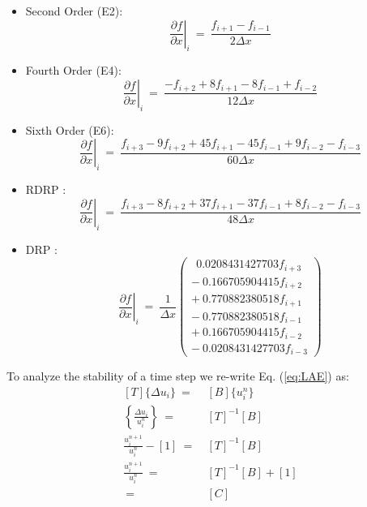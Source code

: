 \documentclass[conf]{new-aiaa}
\begin{document}
\begin{itemize}
	\item Second Order (E2):
		\begin{equation*}
			\left.\frac{\partial{f}}{\partial{x}}\right|_{i}~=~\frac{f_{i+1}-f_{i-1}}{2\Delta{x}}
		\end{equation*}
	\item Fourth Order (E4):
		\begin{equation*}
			\left.\frac{\partial{f}}{\partial{x}}\right|_{i}~=~\frac{-f_{i+2}+8f_{i+1}-8f_{i-1}+f_{i-2}}{12\Delta{x}}
		\end{equation*}	
	\item Sixth Order (E6):
		\begin{equation*}
			\left.\frac{\partial{f}}{\partial{x}}\right|_{i}~=~\frac{f_{i+3}-9f_{i+2}+45f_{i+1}-45f_{i-1}+9f_{i-2}-f_{i-3}}{60\Delta{x}}
		\end{equation*}
	\item RDRP \cite{RDRP}:
		\begin{equation*}
			\left.\frac{\partial{f}}{\partial{x}}\right|_{i}~=~\frac{f_{i+3}-8f_{i+2}+37f_{i+1}-37f_{i-1}+8f_{i-2}-f_{i-3}}{48\Delta{x}}
		\end{equation*}
	\item DRP \cite{DRP}:
		\begin{equation*}
			\left.\frac{\partial{f}}{\partial{x}}\right|_{i}~=~\frac{1}{\Delta{x}}
				\left(\begin{matrix} 	
					~~0.0208431427703f_{i+3} \\
					-~0.166705904415f_{i+2}  \\
					+~0.770882380518f_{i+1}  \\
					-~0.770882380518f_{i-1}  \\
					+~0.166705904415f_{i-2}  \\
					-~0.0208431427703f_{i-3}
				\end{matrix}
				\right)
		\end{equation*}
\end{itemize}
To analyze the stability of a time step we re-write Eq. (\ref{eq:LAE}) as:
\begin{equation}
\label{eq:AB}
	\begin{split}
  		[T]\{\Delta{u_i\}}~=&~[B]\{u_i^{n}\} \\
  		\left\{\frac{\Delta{u_i}}{u_i^{n}}\right\}~=&~[T]^{-1}[B] \\
  		\frac{u_i^{n+1}}{u_i^{n}} - [1]~=&~[T]^{-1}[B] \\
  		\frac{u_i^{n+1}}{u_i^{n}}~=&~[T]^{-1}[B] + [1] \\
  		~=&~[C]
	\end{split}
\end{equation}
\end{document}
